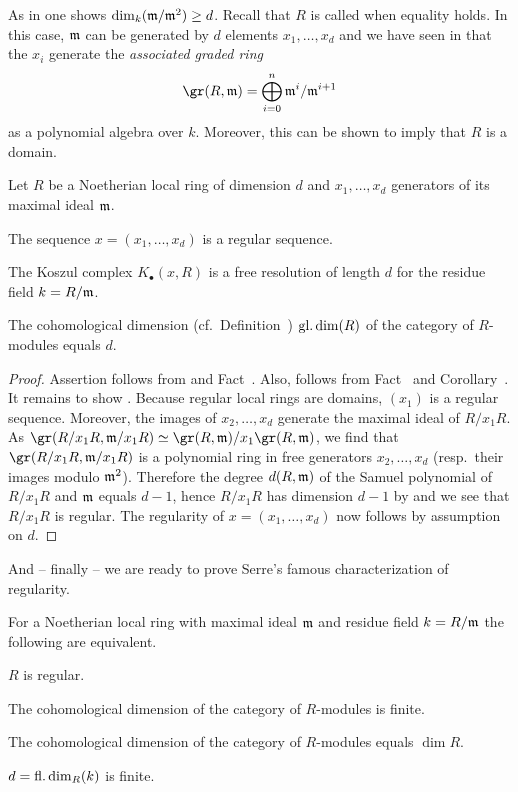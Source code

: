 \documentclass[a4paper,parskip=half,numbers=enddot, DIV=12]{scrreprt}
\begin{document}
As in \cite[Proposition~1.3.1]{alg2} one shows $\dim_k(\mathfrak{m}/\mathfrak{m}^2)\geq d$. Recall that $R$ is called  when equality holds. In this case, $\mathfrak{m}$ can be generated by $d$ elements $x_1,\ldots,x_d$ and we have seen in \cite[Corollary~3.4.9]{alg2} that the $x_i$ generate the \emph{associated graded ring}
\begin{align*}
	\gr(R,\mm)=\bigoplus_{i=0}^n\mm^i/\mm^{i+1}
\end{align*}
as a polynomial algebra over $k$. Moreover, this can be shown to imply that $R$ is a domain.
\begin{prop}
	Let $R$ be a Noetherian local ring of dimension $d$ and $x_1,\ldots,x_d$ generators of its maximal ideal $\mathfrak{m}$.
	\begin{alphanumerate}
		\item The sequence $x=(x_1,\ldots,x_d)$ is a regular sequence.
		\item The Koszul complex $K_\bullet(x,R)$ is a free resolution of length $d$ for the residue field $k=R/\mathfrak{m}$.
		\item The cohomological dimension (cf.\ Definition~) $\operatorname{gl.dim}(R)$ of the category of $R$-modules equals $d$.
	\end{alphanumerate}
\end{prop}
\begin{proof}
	Assertion  follows from  and Fact~. Also,  follows from Fact~ and Corollary~. It remains to show . Because regular local rings are domains, $(x_1)$ is a regular sequence. Moreover, the images of $x_2,\ldots,x_d$ generate the maximal ideal of $R/x_1R$. As $\gr(R/x_1R,\mm/x_1R)\simeq \gr(R,\mm)/x_1\gr(R,\mm)$, we find that $\gr(R/x_1R,\mm/x_1R)$ is a polynomial ring in free generators $x_2,\ldots,x_d$ (resp.\ their images modulo $\mathfrak{m}^2$). Therefore the degree $d(R,\mathfrak{m})$ of the Samuel polynomial of $R/x_1R$ and $\mathfrak{m}$ equals $d-1$, hence $R/x_1R$ has dimension $d-1$ by \cite[Theorem~20]{alg2} and we see that $R/x_1R$ is regular. The regularity of $x=(x_1,\ldots,x_d)$ now follows by assumption on $d$.
\end{proof}
And -- finally -- we are ready to prove Serre's famous characterization of regularity.
\begin{thm}[Serre]
	For a Noetherian local ring with maximal ideal $\mathfrak{m}$ and residue field $k=R/\mathfrak{m}$ the following are equivalent.
	\begin{alphanumerate}
		\item $R$ is regular.
		\item The cohomological dimension of the category of $R$-modules is finite.
		\item The cohomological dimension of the category of $R$-modules equals $\dim R$.
		\item $d=\operatorname{fl.dim}_R(k)$ is finite.
	\end{alphanumerate}
\end{thm}
\end{document}
